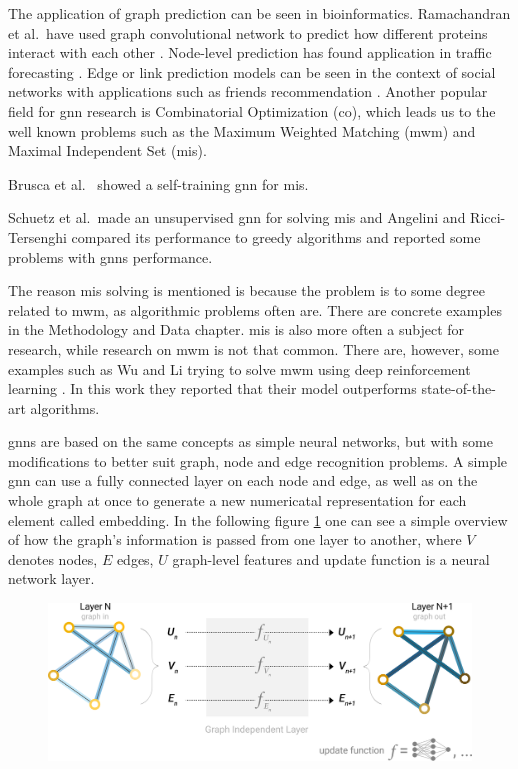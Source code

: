 The application of graph prediction can be seen in bioinformatics. Ramachandran et al.\ have used graph convolutional network to predict how different proteins interact with each other \cite{ramachandran2019protein}. Node-level prediction has found application in traffic forecasting \cite{Yu2018}. Edge or link prediction models can be seen in the context of social networks with applications such as friends recommendation \cite{ADAMIC2003211}. Another popular field for \gls{gnn} research is Combinatorial Optimization (\gls{co}), which leads us to the well known problems such as the Maximum Weighted Matching (\gls{mwm}) and Maximal Independent Set (\gls{mis}).

Brusca et al.\ \cite{brusca2023maximum} showed a self-training \gls{gnn} for \gls{mis}. 

Schuetz et al.\ made an unsupervised \gls{gnn} \cite{Schuetz2022} for solving \gls{mis} and Angelini and Ricci-Tersenghi \cite{Angelini2022} compared its performance to greedy algorithms and reported some problems with \gls{gnn}s performance.

The reason \gls{mis} solving is mentioned is because the problem is to some degree related to \gls{mwm}, as algorithmic problems often are. There are concrete examples in the Methodology and Data chapter. \gls{mis} is also more often a subject for research, while research on \gls{mwm} is not that common. There are, however, some examples such as Wu and Li trying to solve \gls{mwm} using deep reinforcement learning \cite{WU2022400}. In this work they reported that their model outperforms state-of-the-art algorithms.

\gls{gnn}s are based on the same concepts as simple neural networks, but with some modifications to better suit graph, node and edge recognition problems. A simple \gls{gnn} can use a fully connected layer on each node and edge, as well as on the whole graph at once to generate a new numericatal representation for each element called embedding. In the following figure \ref{GNN example} one can see a simple overview of how the graph's information is passed from one layer to another, where $V$ denotes nodes, $E$ edges, $U$ graph-level features and update function is a neural network layer.

\begin{figure}[H]
    \centering
    \includegraphics[scale=0.8]{figures/gnnintro}
    \label{GNN example}
\end{figure}

